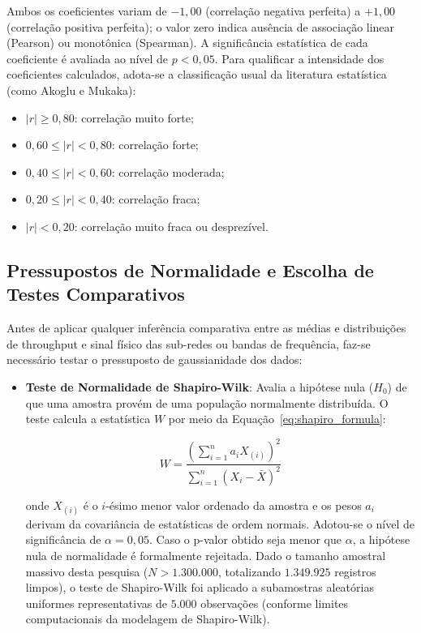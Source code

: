 Ambos os coeficientes variam de $-1,00$ (correlação negativa perfeita) a $+1,00$ (correlação positiva perfeita); o valor zero indica ausência de associação linear (Pearson) ou monotônica (Spearman). A significância estatística de cada coeficiente é avaliada ao nível de $p < 0,05$. Para qualificar a intensidade dos coeficientes calculados, adota-se a classificação usual da literatura estatística (como Akoglu e Mukaka):
\begin{itemize}
    \item $|r| \ge 0,80$: correlação muito forte;
    \item $0,60 \le |r| < 0,80$: correlação forte;
    \item $0,40 \le |r| < 0,60$: correlação moderada;
    \item $0,20 \le |r| < 0,40$: correlação fraca;
    \item $|r| < 0,20$: correlação muito fraca ou desprezível.
\end{itemize}

\subsection{Pressupostos de Normalidade e Escolha de Testes Comparativos}
\label{subsec:metodologia_normalidade_teoria}

Antes de aplicar qualquer inferência comparativa entre as médias e distribuições de throughput e sinal físico das sub-redes ou bandas de frequência, faz-se necessário testar o pressuposto de gaussianidade dos dados:

\begin{itemize}
    \item \textbf{Teste de Normalidade de Shapiro-Wilk}: Avalia a hipótese nula ($H_0$) de que uma amostra provém de uma população normalmente distribuída. O teste calcula a estatística $W$ por meio da Equação~\ref{eq:shapiro_formula}:
    
    \begin{equation}
    \label{eq:shapiro_formula}
    W = \frac{\left( \sum_{i=1}^{n} a_i X_{(i)} \right)^2}{\sum_{i=1}^{n} (X_i - \bar{X})^2}
    \end{equation}
    
    onde $X_{(i)}$ é o $i$-ésimo menor valor ordenado da amostra e os pesos $a_i$ derivam da covariância de estatísticas de ordem normais. Adotou-se o nível de significância de $\alpha = 0,05$. Caso o p-valor obtido seja menor que $\alpha$, a hipótese nula de normalidade é formalmente rejeitada. Dado o tamanho amostral massivo desta pesquisa ($N > 1.300.000$, totalizando $1.349.925$ registros limpos), o teste de Shapiro-Wilk foi aplicado a subamostras aleatórias uniformes representativas de $5.000$ observações (conforme limites computacionais da modelagem de Shapiro-Wilk).
\end{itemize}

